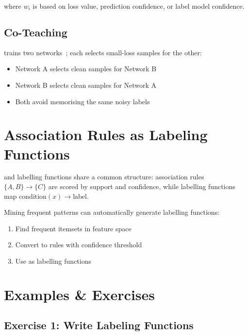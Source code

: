 where $w_i$ is based on loss value, prediction confidence, or label model confidence.

\subsection{Co-Teaching}

 trains two networks~\cite{Han2018CoTeaching}; each selects small-loss samples for the other:
\begin{itemize}
    \item Network A selects clean samples for Network B
    \item Network B selects clean samples for Network A
    \item Both avoid memorising the same noisy labels
\end{itemize}


\section{Association Rules as Labeling Functions}


 and labelling functions share a common structure: association rules $\{A, B\} \to \{C\}$ are scored by support and confidence, while labelling functions map $\text{condition}(x) \to \text{label}$.

Mining frequent patterns can automatically generate labelling functions:
\begin{enumerate}
    \item Find frequent itemsets in feature space
    \item Convert to rules with confidence threshold
    \item Use as labelling functions
\end{enumerate}



\newpage
\section{Examples \& Exercises}

\subsection{Exercise 1: Write Labeling Functions}

